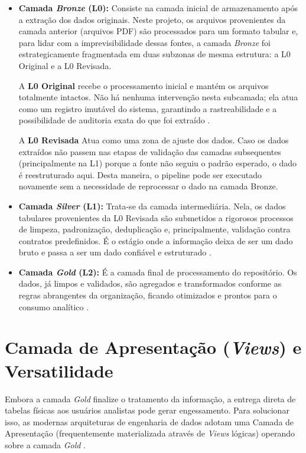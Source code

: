 \begin{itemize}
    \item \textbf{Camada \textit{Bronze} (L0):} Consiste na camada inicial de armazenamento após a extração dos dados originais. Neste projeto, os arquivos provenientes da camada anterior (arquivos PDF) são processados para um formato tabular e, para lidar com a imprevisibilidade dessas fontes, a camada \textit{Bronze} foi estrategicamente fragmentada em duas subzonas de mesma estrutura: a L0 Original e a L0 Revisada. 
    
    A \textbf{L0 Original} recebe o processamento inicial e mantém os arquivos totalmente intactos. Não há nenhuma intervenção nesta subcamada; ela atua como um registro imutável do sistema, garantindo a rastreabilidade e a possibilidade de auditoria exata do que foi extraído \cite{gorelik19}. 
    
    A \textbf{L0 Revisada} Atua como uma zona de ajuste dos dados. Caso os dados extraídos não passem nas etapas de validação das camadas subsequentes (principalmente na L1) porque a fonte não seguiu o padrão esperado, o dado é reestruturado aqui. Desta maneira, o pipeline pode ser executado novamente sem a necessidade de reprocessar o dado na camada Bronze.
    
    \item \textbf{Camada \textit{Silver} (L1):} Trata-se da camada intermediária. Nela, os dados tabulares provenientes da L0 Revisada são submetidos a rigorosos processos de limpeza, padronização, deduplicação e, principalmente, validação contra contratos predefinidos. É o estágio onde a informação deixa de ser um dado bruto e passa a ser um dado confiável e estruturado \cite{gujjala_medallion}.
    
    \item \textbf{Camada \textit{Gold} (L2):} É a camada final de processamento do repositório. Os dados, já limpos e validados, são agregados e transformados conforme as regras abrangentes da organização, ficando otimizados e prontos para o consumo analítico \cite{databricks_medallion}.
\end{itemize}

\section{Camada de Apresentação (\textit{Views}) e Versatilidade}

Embora a camada \textit{Gold} finalize o tratamento da informação, a entrega direta de tabelas físicas aos usuários analistas pode gerar engessamento. Para solucionar isso, as modernas arquiteturas de engenharia de dados adotam uma Camada de Apresentação (frequentemente materializada através de \textit{Views} lógicas) operando sobre a camada \textit{Gold} \cite{reis22}. 

